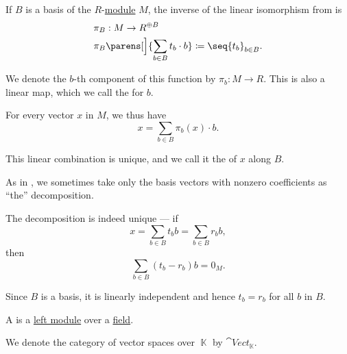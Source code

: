 \begin{definition}\label{def:basis_decomposition}
  If \( B \) is a basis of the \( R \)-\hyperref[def:module]{module} \( M \), the inverse of the linear isomorphism from  is
  \begin{equation*}
    \begin{aligned}
      &\pi_B: M \to R^{\oplus B} \\
      &\pi_B\parens[\Big]{ \sum_{b \in B} t_b \cdot b } \coloneqq \seq{ t_b }_{b \in B}.
    \end{aligned}
  \end{equation*}

  We denote the \( b \)-th component of this function by \( \pi_b: M \to R \). This is also a linear map, which we call the  for \( b \).

  For every vector \( x \) in \( M \), we thus have
  \begin{equation*}
    x = \sum_{b \in B} \pi_b(x) \cdot b.
  \end{equation*}

  This linear combination is unique, and we call it the  of \( x \) along \( B \).

  As in , we sometimes take only the basis vectors with nonzero coefficients as \enquote{the} decomposition.
\end{definition}
\begin{defproof}
  The decomposition is indeed unique --- if
  \begin{equation*}
    x = \sum_{b \in B} t_b b = \sum_{b \in B} r_b b,
  \end{equation*}
  then
  \begin{equation*}
    \sum_{b \in B} (t_b - r_b) b = 0_M.
  \end{equation*}

  Since \( B \) is a basis, it is linearly independent and hence \( t_b = r_b \) for all \( b \) in \( B \).
\end{defproof}

\begin{definition}\label{def:vector_space}
  A  is a \hyperref[def:module]{left module} over a \hyperref[def:field]{field}.

  We denote the category of vector spaces over \( \BbbK \) by \( \cat{Vect}_{\BbbK} \).
\end{definition}

